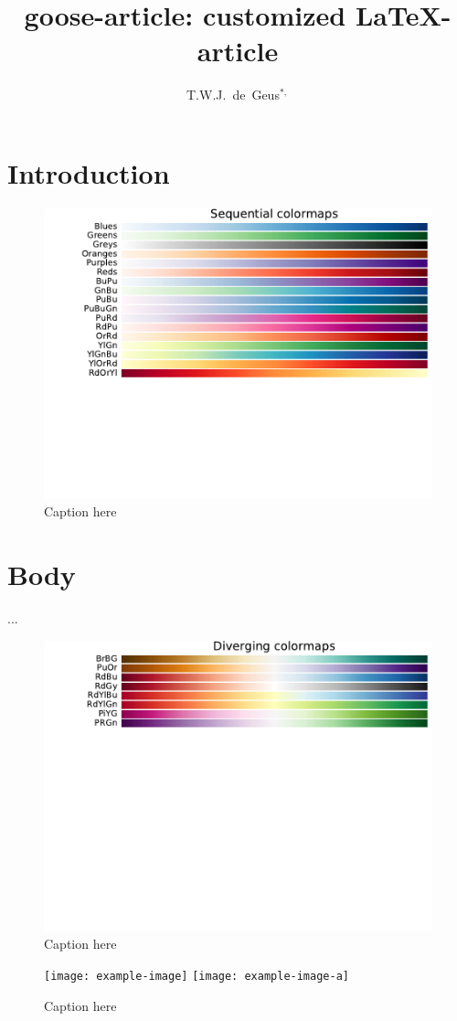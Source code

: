 \documentclass{goose-article}
\title{goose-article: customized \LaTeX-article}
\author[1]{T.W.J.~de~Geus$^{*,}$}
\affil[1]{
  Physics Institute, \'{E}cole Polytechnique F\'{e}d\'{e}rale de Lausanne (EPFL) \nl
  Switzerland
}
\begin{document}
\maketitle

\begin{abstract}
\noindent
\lipsum[1]

\end{abstract}

\section{Introduction}
\lipsum[2-4] \citep{Geus10,Geus11,Geus12}

\begin{figure}[htp]
  \centering
  \includegraphics[width=.5\linewidth]{figures/Sequential}
  \caption{Caption here}
  \label{fig:a}
\end{figure}

\section{Body}
\lipsum[5-10] \citet{Geus13,Foo.Bar} ...

\begin{figure}[htp]
  \centering
  \includegraphics[width=.5\linewidth]{figures/Diverging}
  \caption{Caption here}
  \label{fig:b}
\end{figure}

\begin{figure}[htp]
  \centering
  \texttt{[image: example-image]}
  \texttt{[image: example-image-a]}
  \caption{Caption here}
  \label{fig:c}
\end{figure}


% 
\end{document}
